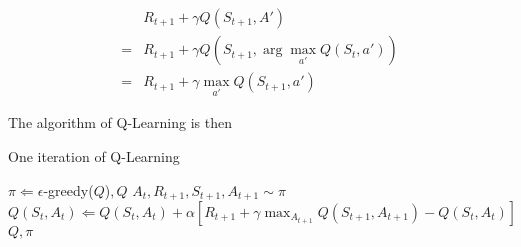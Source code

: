 \begin{equation}
	\begin{aligned}
		  & R_{t+1} + \gamma Q(S_{t+1}, A')\\
		= & R_{t+1} + \gamma Q(S_{t+1}, \arg\max_{a'} Q(S_t, a'))\\
		= & R_{t+1} + \gamma \max_{a'} Q(S_{t+1}, a')
	\end{aligned}
\end{equation}

The algorithm of Q-Learning is then

\begin{algorithm}[H]
	\caption{One iteration of Q-Learning}
	\label{alg:Q-Learning}
	\begin{algorithmic}
		\REQUIRE $\pi \Leftarrow \epsilon$-greedy($Q$)$, Q$
		\STATE $A_t, R_{t+1}, S_{t+1}, A_{t+1} \sim \pi$
		\STATE $Q(S_t, A_t) \Leftarrow Q(S_t, A_t) + \alpha \left[R_{t+1} + \gamma \max_{A_{t+1}} Q(S_{t+1}, A_{t+1}) - Q(S_t, A_t) \right]$
		\ENDFOR
		\RETURN $Q, \pi$
	\end{algorithmic}
\end{algorithm}